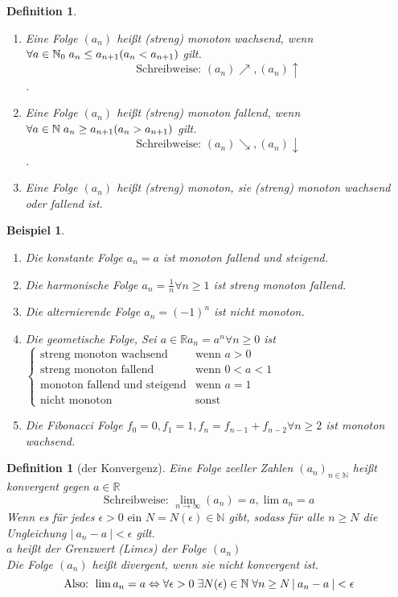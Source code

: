 \documentclass[a4paper,titlepage,oneside]{article}
\def\N{\ensuremath{\mathbb{N}} }
\def\R{\ensuremath{\mathbb{R}} }
\newcommand{\fa}{\ensuremath{\forall}}
\newcommand{\ex}{\ensuremath{\exists}}
\newcommand{\abs}[1]{\ensuremath{\left|\:#1\:\right|}}
\def\sp{\hspace{0,1cm}}
\renewcommand{\liminf}[2]{\ensuremath{\lim\limits_{#1 \rightarrow \infty}{\left(#2\right)}}}
\theoremstyle{thmstyle}
\newtheorem{defi}[satz]{Definition}
\newtheorem{bsp}[satz]{Beispiel}
\begin{document}
\begin{defi}
\begin{enumerate}
\item Eine Folge \((a_n)\) heißt (streng) monoton wachsend, wenn \( \fa a \in \N_0 \sp a_n \le a_{n+1} (a_n < a_{n+1})\) gilt.
\[\text{Schreibweise: }(a_n)\nearrow, (a_n)\uparrow\].
\item Eine Folge \((a_n)\) heißt (streng) monoton fallend, wenn \( \fa a \in \N \sp a_n \ge a_{n+1} (a_n > a_{n+1})\) gilt.
\[\text{Schreibweise: } (a_n)\searrow, (a_n)\downarrow\].
\item Eine Folge \((a_n)\) heißt (streng) monoton, sie (streng) monoton wachsend oder fallend ist.
\end{enumerate}
\end{defi}

\begin{bsp}
\begin{enumerate}
\item Die konstante Folge \(a_n = a\) ist monoton fallend und steigend.
\item Die harmonische Folge \(a_n = \frac{1}{n} \fa n \ge 1\) ist streng monoton fallend.
\item Die alternierende Folge \(a_n = (-1)^n\) ist nicht monoton.
\item Die geometische Folge, Sei \(a \in \R a_n = a^n \fa n \ge 0 \) ist \(\begin{cases}
\text{streng monoton wachsend} & \text{wenn } a > 0\\
\text{streng monoton fallend} & \text{wenn } 0 < a < 1\\
\text{monoton fallend und steigend} & \text{wenn } a = 1\\
\text{nicht monoton} & \text{sonst}
\end{cases} \)
\item Die Fibonacci Folge \(f_0 = 0, f_1 = 1, f_n = f_{n-1} + f_{n-2} \fa{n \ge 2}\) ist monoton wachsend.
\end{enumerate}
\end{bsp}

\begin{defi}[der Konvergenz]
Eine Folge zeeller Zahlen \((a_n)_{n\in\N}\) heißt konvergent gegen \( a\in\R\)
\[\text{Schreibweise: } \liminf{n}{a_n} = a, \lim{a_n} = a\]
Wenn es für jedes \(\epsilon > 0 \text{ ein } N = N(\epsilon) \in \N\) gibt, sodass für alle \(n \ge N\) die Ungleichung \(\abs{a_n - a} < \epsilon\) gilt.\\
\(a\) heißt der Grenzwert (Limes) der Folge \((a_n)\)\\
Die Folge \((a_n)\) heißt divergent, wenn sie nicht konvergent ist.
\[\text{Also: } \lim{a_n} = a \Leftrightarrow \fa \epsilon > 0 \sp \ex N(\epsilon) \in \N \sp \fa n\ge N \abs{a_n - a} < \epsilon\]
\end{defi}
\end{document}
